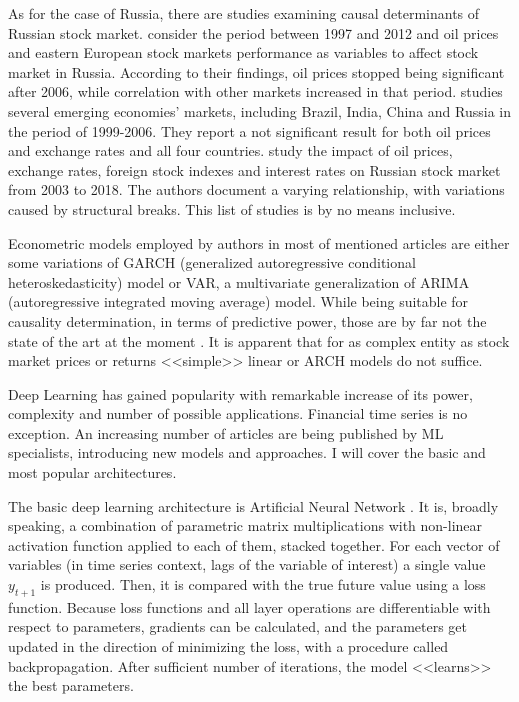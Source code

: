 \documentclass{elsarticle}
\begin{document}
As for the case of Russia, there are studies examining causal determinants of Russian stock market. \citet{kordonis_stock_2016} consider the period between 1997 and 2012 and oil prices and eastern European stock markets performance as variables to affect stock market in Russia. According to their findings, oil prices stopped being significant after 2006, while correlation with other markets increased in that period. \citet{robert_d_gay_effect_2008} studies several emerging economies' markets, including Brazil, India, China and Russia in the period of 1999-2006. They report a not significant result for both oil prices and exchange rates and all four countries. \citet{lozinskaia_fundamental_2019} study the impact of oil prices, exchange rates, foreign stock indexes and interest rates on Russian stock market from 2003 to 2018. The authors document a varying relationship, with variations caused by structural breaks. This list of studies is by no means inclusive.

Econometric models employed by authors in most of mentioned articles are either some variations of GARCH (generalized autoregressive conditional heteroskedasticity) model or VAR, a multivariate generalization of ARIMA (autoregressive integrated moving average) model. While being suitable for causality determination, in terms of predictive power, those are by far not the state of the art at the moment \citep{siami-namini_forecasting_2018}. It is apparent that for as complex entity as stock market prices or returns <<simple>> linear or ARCH models do not suffice.

Deep Learning has gained popularity with remarkable increase of its power, complexity and number of possible applications. Financial time series is no exception. An increasing number of articles are being published by ML specialists, introducing new models and approaches. I will cover the basic and most popular architectures.

The basic deep learning architecture is Artificial Neural Network \citep{sezer_financial_2019}. It is, broadly speaking, a combination of parametric matrix multiplications with non-linear activation function applied to each of them, stacked together. For each vector of variables (in time series context, lags of the variable of interest) a single value $y_{t+1}$ is produced. Then, it is compared with the true future value using a loss function. Because loss functions and all layer operations are differentiable with respect to parameters, gradients can be calculated, and the parameters get updated in the direction of minimizing the loss, with a procedure called backpropagation. After sufficient number of iterations, the model <<learns>> the best parameters.
\end{document}
